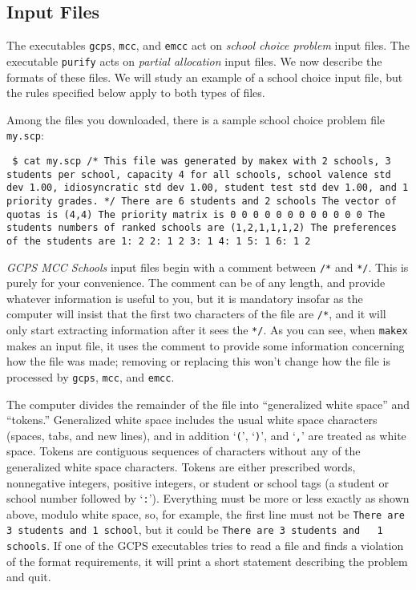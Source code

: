 \documentclass[12pt]{article}
\theoremstyle{definition}
\begin{document}
\subsection{Input Files}

The executables \texttt{gcps}, \texttt{mcc}, and \texttt{emcc} act on
\emph{school choice problem} input files.  The executable
\texttt{purify} acts on \emph{partial allocation} input files.  We now
describe the formats of these files. We will study an example of a
school choice input file, but the rules specified below apply to both
types of files.

Among the files you downloaded, there is a sample school choice
problem file \texttt{my.scp}:

\begin{obeylines}\texttt{
    \$ cat my.scp
/* This file was generated by makex with 2 schools,
3 students per school, capacity 4 for all schools,
school valence std dev 1.00, idiosyncratic std dev 1.00,
student test std dev 1.00, and 1 priority grades. */
There are 6 students and 2 schools
The vector of quotas is (4,4)
The priority matrix is
    0    0
    0    0
    0    0
    0    0
    0    0
    0    0
The students numbers of ranked schools are
(1,2,1,1,1,2)
The preferences of the students are
1:    2
2:    1   2
3:    1
4:    1
5:    1
6:    1   2
  }
\end{obeylines}

\medskip

\emph{GCPS MCC Schools} input files begin with a comment between
\texttt{/*} and \texttt{*/}.  This is purely for your convenience.
The comment can be of any length, and provide whatever information is
useful to you, but it is mandatory insofar as the computer will insist
that the first two characters of the file are \texttt{/*}, and it will
only start extracting information after it sees the \texttt{*/}.  As
you can see, when \texttt{makex} makes an input file, it uses the
comment to provide some information concerning how the file was made;
removing or replacing this won't change how the file is processed by
\texttt{gcps}, \texttt{mcc}, and \texttt{emcc}.

The computer divides the remainder of the file into ``generalized
white space'' and ``tokens.''  Generalized white space includes the
usual white space characters (spaces, tabs, and new lines), and in
addition `\texttt{(}', `\texttt{)}', and `\texttt{,}' are treated as
white space.  Tokens are contiguous sequences of characters without
any of the generalized white space characters.  Tokens are either
prescribed words, nonnegative integers, positive integers, or student
or school tags (a student or school number followed by `\texttt{:}').
Everything must be more or less exactly as shown above, modulo white
space, so, for example, the first line must not be \texttt{There are 3
  students and 1 school}, but it could be \texttt{There are 3 students
  and \ \ 1 schools}.  If one of the GCPS executables tries to read a
file and finds a violation of the format requirements, it will print a
short statement describing the problem and quit.
\end{document}
